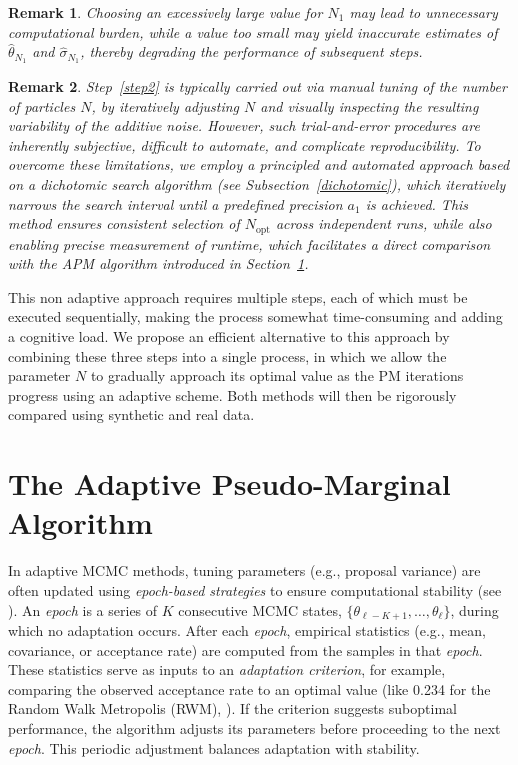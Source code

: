 \documentclass[pdflatex,sn-mathphys-num]{sn-jnl}
\theoremstyle{thmstyleone}
\theoremstyle{thmstyletwo}
\newtheorem{remark}{Remark}
\theoremstyle{thmstylethree}
\begin{document}
\begin{remark}
        Choosing an excessively large value for \( N_1 \) may lead to unnecessary computational burden, while a value too small may yield inaccurate estimates of \( \hat\theta_{N_1} \) and \( \hat\sigma_{N_1} \), thereby degrading the performance of subsequent steps.
\end{remark}
\begin{remark}
Step~\ref{step2} is typically carried out via manual tuning of the number of particles \( N \), by iteratively adjusting \( N \) and visually inspecting the resulting variability of the additive noise. However, such trial-and-error procedures are inherently subjective, difficult to automate, and complicate reproducibility. To overcome these limitations, we employ a principled and automated approach based on a \emph{dichotomic search} algorithm (see Subsection~\ref{dichotomic}), which iteratively narrows the search interval until a predefined precision \( a_1 \) is achieved. This method ensures consistent selection of \( N_{\text{opt}} \) across independent runs, while also enabling precise measurement of runtime, which facilitates a direct comparison with the APM algorithm introduced in Section~\ref{sec:APM}.
\end{remark}

This non adaptive approach requires multiple steps, each of which must be executed sequentially, making the process somewhat time-consuming and adding a cognitive load. We propose an efficient alternative to this approach by combining these three steps into a single process, in which we allow the parameter $N$ to gradually approach its optimal value as the PM iterations progress using an adaptive scheme. Both methods will then be rigorously compared using synthetic and real data. 

\section{The Adaptive Pseudo-Marginal Algorithm}
\label{sec:APM}
In adaptive MCMC methods, tuning parameters (e.g., proposal variance) are often updated using \textit{epoch-based strategies} to ensure computational stability (see \citep{roberts_examples_2009, haario_adaptive_2001}). An \textit{epoch} is a series of $K$ consecutive MCMC states, \( \{\theta_{\ell-K+1}, \dots, \theta_\ell\} \), during which no adaptation occurs. After each \textit{epoch}, empirical statistics (e.g., mean, covariance, or acceptance rate) are computed from the samples in that \textit{epoch}. These statistics serve as inputs to an \textit{adaptation criterion}, for example, comparing the observed acceptance rate to an optimal value (like 0.234 for the Random Walk Metropolis (RWM), \cite{gelman_weak_1997}). If the criterion suggests suboptimal performance, the algorithm adjusts its parameters before proceeding to the next \textit{epoch}. This periodic adjustment balances adaptation with stability.
\end{document}
